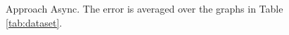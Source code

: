 \begin{figure}[!hbt]
  \centering
   \\[-1ex]
   \\[-2ex]
\caption{Approach Async. The error is averaged over the graphs in Table \ref{tab:dataset}.}
  \label{fig:approach-async}
\end{figure}
